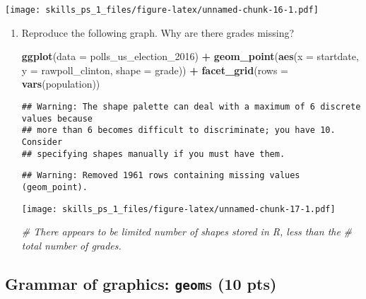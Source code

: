 \documentclass[
]{article}
\newenvironment{Shaded}{\begin{snugshade}}{\end{snugshade}}
\newcommand{\CommentTok}[1]{\textcolor[rgb]{0.56,0.35,0.01}{\textit{#1}}}
\newcommand{\DataTypeTok}[1]{\textcolor[rgb]{0.13,0.29,0.53}{#1}}
\newcommand{\DecValTok}[1]{\textcolor[rgb]{0.00,0.00,0.81}{#1}}
\newcommand{\KeywordTok}[1]{\textcolor[rgb]{0.13,0.29,0.53}{\textbf{#1}}}
\newcommand{\NormalTok}[1]{#1}
\newcommand{\OperatorTok}[1]{\textcolor[rgb]{0.81,0.36,0.00}{\textbf{#1}}}
\newcommand{\StringTok}[1]{\textcolor[rgb]{0.31,0.60,0.02}{#1}}
\begin{document}
\texttt{[image: skills\_ps\_1\_files/figure-latex/unnamed-chunk-16-1.pdf]}

\begin{enumerate}
\def\labelenumi{\arabic{enumi}.}
\item
  Reproduce the following graph. Why are there grades missing?

\begin{Shaded}
\begin{Highlighting}[]
\KeywordTok{ggplot}\NormalTok{(}\DataTypeTok{data =}\NormalTok{ polls_us_election_}\DecValTok{2016}\NormalTok{) }\OperatorTok{+}
\StringTok{  }\KeywordTok{geom_point}\NormalTok{(}\KeywordTok{aes}\NormalTok{(}\DataTypeTok{x =}\NormalTok{ startdate, }
             \DataTypeTok{y =}\NormalTok{ rawpoll_clinton,}
             \DataTypeTok{shape =}\NormalTok{ grade)) }\OperatorTok{+}
\StringTok{  }\KeywordTok{facet_grid}\NormalTok{(}\DataTypeTok{rows =} \KeywordTok{vars}\NormalTok{(population))}
\end{Highlighting}
\end{Shaded}

\begin{verbatim}
## Warning: The shape palette can deal with a maximum of 6 discrete values because
## more than 6 becomes difficult to discriminate; you have 10. Consider
## specifying shapes manually if you must have them.
\end{verbatim}

\begin{verbatim}
## Warning: Removed 1961 rows containing missing values (geom_point).
\end{verbatim}

  \texttt{[image: skills\_ps\_1\_files/figure-latex/unnamed-chunk-17-1.pdf]}

\begin{Shaded}
\begin{Highlighting}[]
\CommentTok{# There appears to be limited number of shapes stored in R, less than the }
\CommentTok{# total number of grades.}
\end{Highlighting}
\end{Shaded}
\end{enumerate}

\hypertarget{grammar-of-graphics-geoms-10-pts}{%
\subsection{\texorpdfstring{Grammar of graphics: \texttt{geom}s (10
pts)}{Grammar of graphics: geoms (10 pts)}}\label{grammar-of-graphics-geoms-10-pts}}
\end{document}
